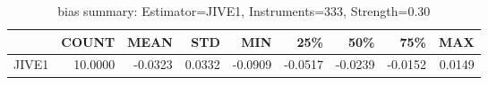 \begin{table}[ht]
\centering
\caption{bias summary: Estimator=JIVE1, Instruments=333, Strength=0.30}
\begin{tabular}{lrrrrrrrr}
\toprule
 & COUNT & MEAN & STD & MIN & 25\% & 50\% & 75\% & MAX \\
\midrule
JIVE1 & 10.0000 & -0.0323 & 0.0332 & -0.0909 & -0.0517 & -0.0239 & -0.0152 & 0.0149 \\
\bottomrule
\end{tabular}
\end{table}

